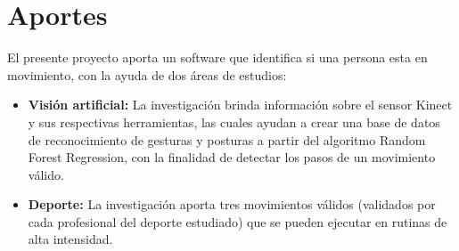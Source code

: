 \section{Aportes}
El presente proyecto aporta un software que identifica si una persona esta en movimiento, con la ayuda de dos \'areas de estudios:
\begin{itemize}
	\item \textbf{Visi\'on artificial:} La investigaci\'on brinda informaci\'on sobre el sensor Kinect y sus respectivas herramientas, las cuales ayudan a crear una base de datos de reconocimiento de gesturas y posturas a partir del algoritmo Random Forest Regression, con la finalidad de detectar los pasos de un movimiento v\'alido.
	\item \textbf{Deporte:} La investigaci\'on aporta tres movimientos v\'alidos (validados por cada  profesional del deporte estudiado) que se pueden ejecutar en rutinas de alta intensidad.
\end{itemize}